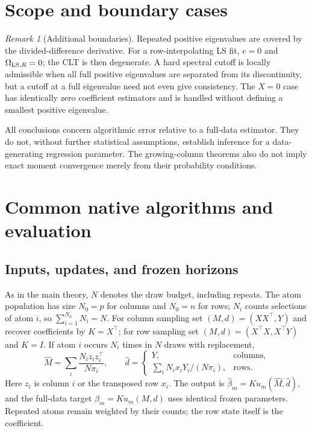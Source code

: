 \documentclass[11pt,a4paper,leqno]{article}
\numberwithin{equation}{section}
\numberwithin{figure}{section}
\numberwithin{table}{section}
\theoremstyle{plain}
\theoremstyle{definition}
\theoremstyle{remark}
\newtheorem{remark}[lemma]{Remark}
\begin{document}
\section{Scope and boundary cases}
\label{supp:sec:boundaries}
\begin{remark}[Additional boundaries]\label{rem:additional_boundaries}
Repeated positive eigenvalues are covered by the divided-difference derivative.
For a row-interpolating LS fit, $e=0$ and $\Omega_{{\rm LS},R}=0$;
the CLT is then degenerate. A hard spectral cutoff is locally admissible
when all full positive eigenvalues are separated from its discontinuity,
but a cutoff at a full eigenvalue need not even give consistency.
The $X=0$ case has identically zero coefficient estimators and is handled
without defining a smallest positive eigenvalue.

All conclusions concern algorithmic error relative to a full-data estimator.
They do not, without further statistical assumptions, establish inference
for a data-generating regression parameter. The growing-column theorems
also do not imply exact moment convergence merely from their probability
conditions.
\end{remark}



\section{Common native algorithms and evaluation}
\label{supp:sec:native_common}
\subsection{Inputs, updates, and frozen horizons}
As in the main theory, $N$ denotes the draw budget, including repeats. The atom population has size $N_0=p$ for columns and $N_0=n$ for rows; $N_i$ counts selections of atom $i$, so $\sum_{i=1}^{N_0}N_i=N$.
For column sampling set $(M,d)=(XX^\top,Y)$ and recover coefficients
by $K=X^\top$; for row sampling set $(M,d)=(X^\top X,X^\top Y)$ and
$K=I$. If atom $i$ occurs $N_i$ times in $N$ draws with replacement,
\[
 \widehat M=\sum_i\frac{N_i z_i z_i^\top}{N\pi_i},\qquad
 \widehat d=\begin{cases}Y,&\text{columns},\\
 \sum_i N_i x_iY_i/(N\pi_i),&\text{rows}.
 \end{cases}
\]
Here $z_i$ is column $i$ or the transposed row $x_i$. The output is
$\widehat\beta_m=K u_m(\widehat M,\widehat d)$, and the full-data target
$\beta_m=K u_m(M,d)$ uses identical frozen parameters. Repeated atoms
remain weighted by their counts; the row state itself is the coefficient.
\end{document}

